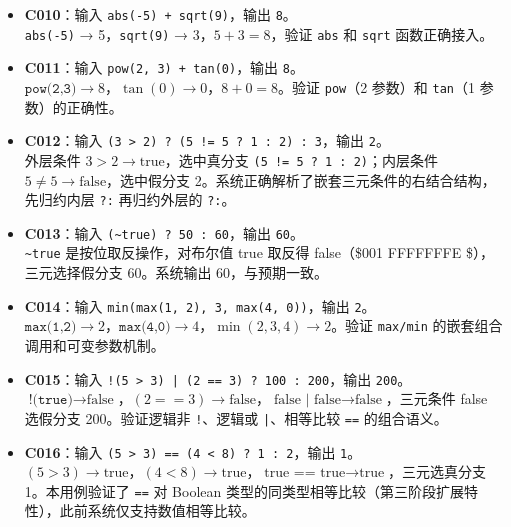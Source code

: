 \documentclass[a4paper]{article}
\begin{document}
\begin{itemize}
    \item \textbf{C010}：输入 \texttt{abs(-5) + sqrt(9)}，输出 \texttt{8}。\\
    \texttt{abs(-5)} → 5，\texttt{sqrt(9)} → 3，$5+3 = 8$，验证 \texttt{abs} 和 \texttt{sqrt} 函数正确接入。
    
    \item \textbf{C011}：输入 \texttt{pow(2, 3) + tan(0)}，输出 \texttt{8}。\\
    $\texttt{pow(2,3)} → 8$，$\tan(0) → 0$，$8+0 = 8$。验证 \texttt{pow}（2 参数）和 \texttt{tan}（1 参数）的正确性。
    
    \item \textbf{C012}：输入 \texttt{(3 > 2) ? (5 != 5 ? 1 : 2) : 3}，输出 \texttt{2}。\\
    外层条件 $3>2 → \text{true}$，选中真分支 \texttt{(5 != 5 ? 1 : 2)}；内层条件 $5\neq5 → \text{false}$，选中假分支 2。系统正确解析了嵌套三元条件的右结合结构，先归约内层 \texttt{?:} 再归约外层的 \texttt{?:}。
    
    \item \textbf{C013}：输入 \texttt{(\textasciitilde true) ? 50 : 60}，输出 \texttt{60}。\\
    \texttt{\textasciitilde true} 是按位取反操作，对布尔值 true 取反得 false（\$001 FFFFFFFE \$），三元选择假分支 60。系统输出 60，与预期一致。
    
    \item \textbf{C014}：输入 \texttt{min(max(1, 2), 3, max(4, 0))}，输出 \texttt{2}。\\
    $\texttt{max(1,2)} → 2$，$\texttt{max(4,0)} → 4$，$\min(2, 3, 4) → 2$。验证 \texttt{max/min} 的嵌套组合调用和可变参数机制。
    
    \item \textbf{C015}：输入 \texttt{!(5 > 3) | (2 == 3) ? 100 : 200}，输出 \texttt{200}。\\
    $\texttt{!(true)} → \text{false}$，$(2==3) → \text{false}$，$\text{false | false} → \text{false}$，三元条件 false 选假分支 200。验证逻辑非 \texttt{!}、逻辑或 \texttt{|}、相等比较 \texttt{==} 的组合语义。
    
    \item \textbf{C016}：输入 \texttt{(5 > 3) == (4 < 8) ? 1 : 2}，输出 \texttt{1}。\\
    $(5>3) → \text{true}$，$(4<8) → \text{true}$，$\text{true == true} → \text{true}$，三元选真分支 1。本用例验证了 \texttt{==} 对 Boolean 类型的同类型相等比较（第三阶段扩展特性），此前系统仅支持数值相等比较。
\end{itemize}
\end{document}
